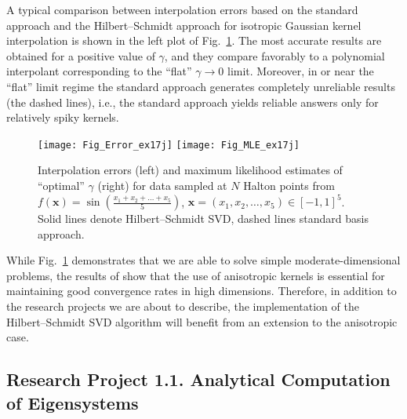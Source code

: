 \documentclass[11pt]{NSFamsart}
\newcommand{\bx}{{\boldsymbol{x}}}
\begin{document}
A typical comparison between interpolation errors based on the standard approach and the Hilbert--Schmidt approach for isotropic Gaussian kernel interpolation is shown in the left plot of Fig.~\ref{Fig_HSSVD}. The most accurate results are obtained for a positive value of $\gamma$, and they compare favorably to a polynomial interpolant corresponding to the ``flat'' $\gamma\to0$ limit. Moreover, in or near the ``flat'' limit regime the standard approach generates completely unreliable results (the dashed lines), i.e., the standard approach yields reliable answers only for relatively spiky kernels.

\begin{figure}[h]
    \centering
    \texttt{[image: Fig\_Error\_ex17j]}
    \texttt{[image: Fig\_MLE\_ex17j]}
\caption{Interpolation errors (left) and maximum likelihood estimates of ``optimal'' $\gamma$ (right) for data sampled at $N$ Halton points from $f(\bx) = \sin\left(\tfrac{x_1+x_2+\ldots+x_5}{5}\right)$, $\bx=(x_1,x_2,\ldots,x_5) \in [-1,1]^5$. Solid lines denote Hilbert--Schmidt SVD, dashed lines standard basis approach.}\label{Fig_HSSVD}
\end{figure}

While Fig.~\ref{Fig_HSSVD} demonstrates that we are able to solve simple moderate-dimensional problems, the results of \cite{FasHicWoz12b, FasHicWoz12a} show that the use of anisotropic kernels is essential for maintaining good convergence rates in high dimensions. Therefore, in addition to the research projects we are about to describe, the implementation of the Hilbert--Schmidt SVD algorithm will benefit from an extension to the anisotropic case.

\subsection*{Research Project 1.1. Analytical Computation of Eigensystems} \label{AnalyticEigensubsec}
\end{document}
